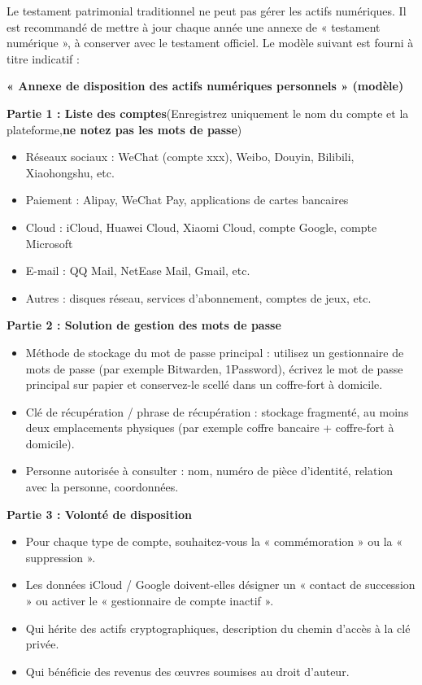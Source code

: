 
Le testament patrimonial traditionnel ne peut pas gérer les actifs numériques. Il est recommandé de mettre à jour chaque année une annexe de « testament numérique », à conserver avec le testament officiel. Le modèle suivant est fourni à titre indicatif :

\textbf{« Annexe de disposition des actifs numériques personnels » (modèle)}\par

\textbf{Partie 1 : Liste des comptes}(Enregistrez uniquement le nom du compte et la plateforme,\textbf{ne notez pas les mots de passe})

\begin{itemize}
  \item Réseaux sociaux : WeChat (compte xxx), Weibo, Douyin, Bilibili, Xiaohongshu, etc.
  \item Paiement : Alipay, WeChat Pay, applications de cartes bancaires
  \item Cloud : iCloud, Huawei Cloud, Xiaomi Cloud, compte Google, compte Microsoft
  \item E-mail : QQ Mail, NetEase Mail, Gmail, etc.
  \item Autres : disques réseau, services d'abonnement, comptes de jeux, etc.
\end{itemize}

\textbf{Partie 2 : Solution de gestion des mots de passe}

\begin{itemize}
  \item Méthode de stockage du mot de passe principal : utilisez un gestionnaire de mots de passe (par exemple Bitwarden, 1Password), écrivez le mot de passe principal sur papier et conservez-le scellé dans un coffre-fort à domicile.
  \item Clé de récupération / phrase de récupération : stockage fragmenté, au moins deux emplacements physiques (par exemple coffre bancaire + coffre-fort à domicile).
  \item Personne autorisée à consulter : nom, numéro de pièce d'identité, relation avec la personne, coordonnées.
\end{itemize}

\textbf{Partie 3 : Volonté de disposition}

\begin{itemize}
  \item Pour chaque type de compte, souhaitez-vous la « commémoration » ou la « suppression ».
  \item Les données iCloud / Google doivent-elles désigner un « contact de succession » ou activer le « gestionnaire de compte inactif ».
  \item Qui hérite des actifs cryptographiques, description du chemin d'accès à la clé privée.
  \item Qui bénéficie des revenus des œuvres soumises au droit d'auteur.
\end{itemize}

